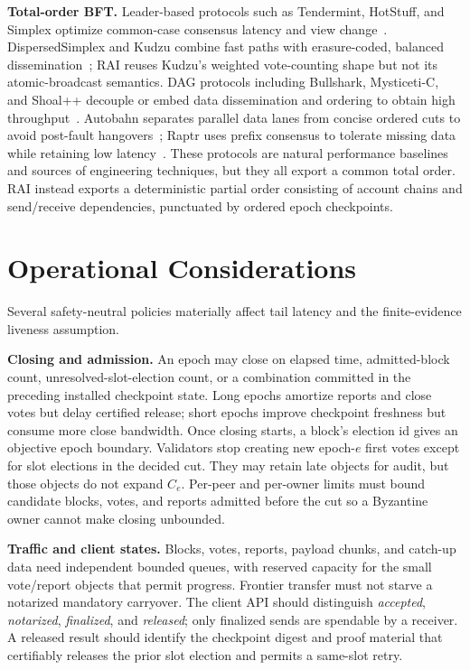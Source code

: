 \documentclass[sigplan,review,anonymous]{acmart}
\newcommand{\sys}{\textsc{RAI}\xspace}
\newcommand{\paragraphhead}[1]{\smallskip\noindent\textbf{#1}}
\begin{document}
\paragraphhead{Total-order BFT.}
Leader-based protocols such as Tendermint, HotStuff, and Simplex optimize common-case consensus latency and view change~\cite{buchman2019tendermint,yin2019hotstuff,chan2023simplex}.  DispersedSimplex and Kudzu combine fast paths with erasure-coded, balanced dissemination~\cite{shoup2024dispersedsimplex,shoup2025kudzu}; \sys reuses Kudzu's weighted vote-counting shape but not its atomic-broadcast semantics.  DAG protocols including Bullshark, Mysticeti-C, and Shoal++ decouple or embed data dissemination and ordering to obtain high throughput~\cite{spiegelman2022bullshark,babel2025mysticeti,arun2025shoalpp}.  Autobahn separates parallel data lanes from concise ordered cuts to avoid post-fault hangovers~\cite{giridharan2024autobahn}; Raptr uses prefix consensus to tolerate missing data while retaining low latency~\cite{tonkikh2025raptr}.  These protocols are natural performance baselines and sources of engineering techniques, but they all export a common total order.  \sys instead exports a deterministic partial order consisting of account chains and send/receive dependencies, punctuated by ordered epoch checkpoints.


\section{Operational Considerations}
\label{sec:operations}

Several safety-neutral policies materially affect tail latency and the finite-evidence liveness assumption.

\paragraphhead{Closing and admission.}
An epoch may close on elapsed time, admitted-block count, unresolved-slot-election count, or a combination committed in the preceding installed checkpoint state.  Long epochs amortize reports and close votes but delay certified release; short epochs improve checkpoint freshness but consume more close bandwidth.  Once closing starts, a block's election id gives an objective epoch boundary.  Validators stop creating new epoch-$e$ first votes except for slot elections in the decided cut.  They may retain late objects for audit, but those objects do not expand $C_e$.  Per-peer and per-owner limits must bound candidate blocks, votes, and reports admitted before the cut so a Byzantine owner cannot make closing unbounded.

\paragraphhead{Traffic and client states.}
Blocks, votes, reports, payload chunks, and catch-up data need independent bounded queues, with reserved capacity for the small vote/report objects that permit progress.  Frontier transfer must not starve a notarized mandatory carryover.  The client API should distinguish \emph{accepted}, \emph{notarized}, \emph{finalized}, and \emph{released}; only finalized sends are spendable by a receiver.  A released result should identify the checkpoint digest and proof material that certifiably releases the prior slot election and permits a same-slot retry.
\end{document}
